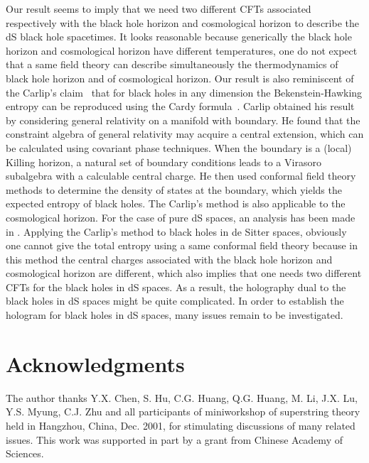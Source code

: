 \documentclass[a4paper,12pt]{article}
\begin{document}
Our result seems to imply that we need two different CFTs associated respectively with the
black hole horizon and cosmological horizon to describe the dS black hole spacetimes. It looks
reasonable because generically the black hole horizon and cosmological horizon have different
temperatures, one do not expect that a same field theory can describe simultaneously the
thermodynamics of black hole horizon and of cosmological horizon. Our result is also 
reminiscent of the Carlip's claim~\cite{Carlip} that for black holes in any dimension the 
Bekenstein-Hawking entropy can be reproduced using the Cardy formula~\cite{Cardy}.  Carlip
obtained his result by considering general relativity on a manifold with boundary. He found
that the constraint algebra of general relativity may acquire a central extension, which can be 
calculated using covariant phase techniques. When the boundary is a (local) Killing horizon, a 
natural set of boundary conditions leads to a Virasoro subalgebra with a calculable central
charge. He then used conformal field theory methods to determine the density of states at the
boundary, which yields the expected entropy of black holes. The Carlip's method is also
applicable to the cosmological horizon. For the case of pure dS spaces, an analysis has been
made in \cite{LWu}. Applying the Carlip's method to black holes in de Sitter spaces,  obviously 
one  cannot give the total entropy using a same conformal field theory because in this method
the central charges associated with the black hole horizon and cosmological horizon are 
different, which also implies that one needs two different CFTs for the  black holes in
dS spaces.  As a result, the holography dual to the black holes in dS spaces might be
quite complicated. In order to establish the hologram for black holes in dS spaces, many
issues remain to be investigated.  
 

 

\section*{Acknowledgments}
The author thanks Y.X. Chen, S. Hu, C.G. Huang, Q.G. Huang, M. Li, J.X. Lu,
 Y.S. Myung, C.J. Zhu and all participants of miniworkshop of superstring theory held 
in Hangzhou, China, Dec. 2001, for stimulating 
discussions of many related issues. This work was supported in part by a grant from Chinese 
Academy of Sciences. 
\end{document}
